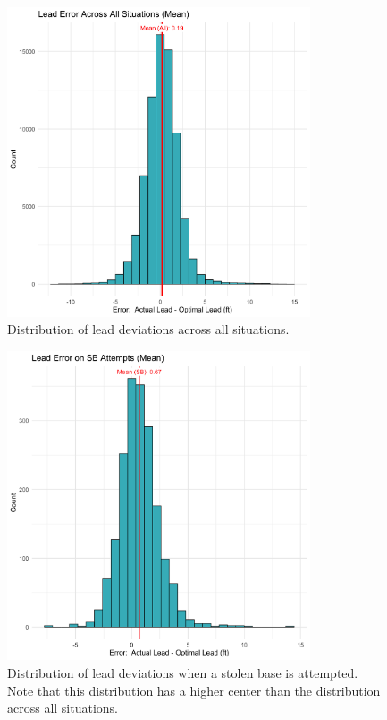 \documentclass[12pt,letterpaper]{article}
\begin{document}
\begin{figure}[!htbp]
    \centering
    \includegraphics[width=0.8\textwidth]{figures/lead-error-all.png}
    \caption{Distribution of lead deviations across all situations.}
    \label{fig:deviation_all}
\end{figure}

\begin{figure}[!htbp]
    \centering
    \includegraphics[width=0.8\textwidth]{figures/lead-error-sb.png}
    \caption{Distribution of lead deviations when a stolen base is attempted. Note that this distribution has a higher center than the distribution across all situations.}
    \label{fig:deviation_sba}
\end{figure}
\end{document}
